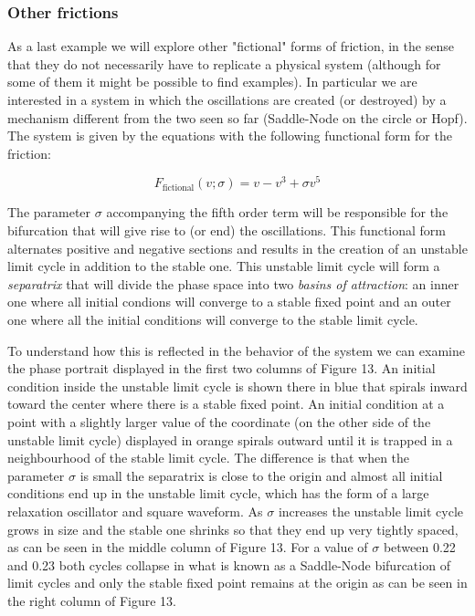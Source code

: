 \documentclass{article}
\begin{document}
\subsubsection{Other frictions}

As a last example we will explore other "fictional" forms of friction, in the sense that they do not necessarily have to replicate a physical system (although for some of them it might be possible to find examples). 
In particular we are interested in a system in which the oscillations are created (or destroyed) by a mechanism different from the two seen so far (Saddle-Node on the circle or Hopf). 
The system is given by the equations with the following functional form for the friction:

\begin{equation} \label{eq_fictional}
    F_{\text{fictional}}(v;\sigma) = v - v^3 + \sigma v^5  
\end{equation}

The parameter $\sigma$ accompanying the fifth order term will be responsible for the bifurcation that will give rise to (or end) the oscillations.
This functional form alternates positive and negative sections and results in the creation of an unstable limit cycle in addition to the stable one. 
This unstable limit cycle will form a {\em separatrix} that will divide the phase space into two {\em basins of attraction}: an inner one where all initial condions will converge to a stable fixed point and an outer one where all the initial conditions will converge to the stable limit cycle. 

To understand how this is reflected in the behavior of the system we can examine the phase portrait displayed in the first two columns of Figure 13. 
An initial condition inside the unstable limit cycle is shown there in blue that spirals inward toward the center where there is a stable fixed point. 
An initial condition at a point with a slightly larger value of the coordinate (on the other side of the unstable limit cycle) displayed in orange spirals outward until it is trapped in a neighbourhood of the stable limit cycle. 
The difference is that when the parameter $\sigma$ is small the separatrix is close to the origin and almost all initial conditions end up in the unstable limit cycle, which has the form of a large relaxation oscillator and square waveform. 
As $\sigma$ increases the unstable limit cycle grows in size and the stable one shrinks so that they end up very tightly spaced, as can be seen in the middle column of Figure 13. 
For a value of $\sigma$ between 0.22 and 0.23 both cycles collapse in what is known as a Saddle-Node bifurcation of limit cycles and only the stable fixed point remains at the origin as can be seen in the right column of Figure 13. 
\end{document}
